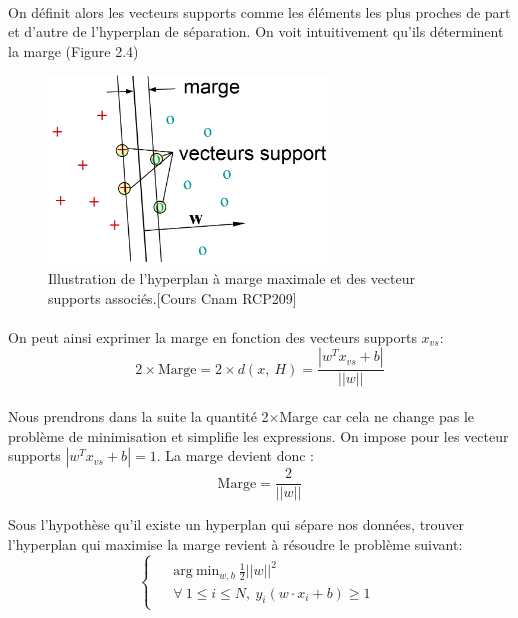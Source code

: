 \documentclass[a4paper,12pt,titlepage]{report}
\begin{document}
\paragraph{}
On définit alors les vecteurs supports comme les éléments les plus proches de part et d'autre de l'hyperplan de séparation. On voit intuitivement qu'ils déterminent la marge (Figure 2.4)
\begin{figure}[!h]
	\begin{center}
	\centering	
		\includegraphics[height =5cm, keepaspectratio]{graphes/svm07.png}
		\caption{Illustration de l'hyperplan à marge maximale et des vecteur supports associés.[Cours Cnam RCP209]}
	\end{center}
\end{figure}
\paragraph{}
On peut ainsi exprimer la marge en fonction des vecteurs supports $x_{vs}$:
\[ 
2 \times \text{Marge} = 2 \times d(x,\ H) = \frac{|w^T x_{vs} + b|}{||w||}
\]
\paragraph{}
Nous prendrons dans la suite la quantité 2$\times$Marge car cela ne change pas le problème de minimisation et simplifie les expressions. On impose pour les vecteur supports $|w^T x_{vs} + b| = 1$. La marge devient donc :
\[ \text{Marge} = \frac{2}{||w||} \]

Sous l'hypothèse qu'il existe un hyperplan qui sépare nos données, trouver l'hyperplan qui maximise la marge revient à résoudre le problème suivant:
\[
	\left\{
	\begin{array}{ccc}		
	\begin{aligned}
		&\text{arg}\ \text{min}_{w,b}\ \frac{1}{2}||w||^{2} \\
		&\forall \ 1 \leqslant i \leqslant N,\ y_i (w \cdot x_i + b)\geqslant 1
	\end{aligned}
\end{array}
	\right.
\]
\end{document}
